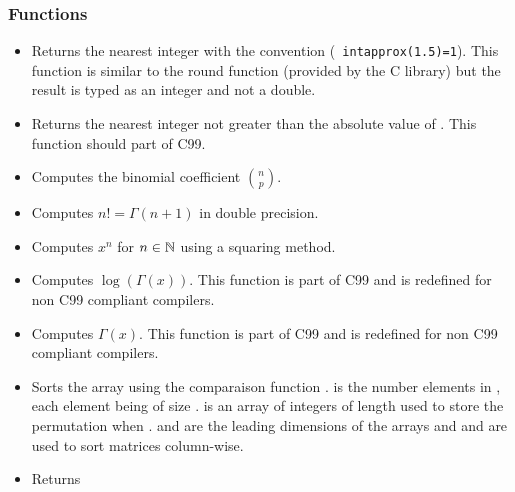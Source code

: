 \subsubsection{Functions}
\begin{itemize}
\item {}
  \sshortdescribe Returns the nearest integer with the convention ({\tt
    intapprox(1.5)=1}). This function is similar to the round function
  (provided by the C library) but the result is typed as an integer and not a
  double.

\item {}
  \sshortdescribe Returns the nearest integer not greater than the absolute
  value of . This function should part of C99.

\item {}
  \sshortdescribe Computes the binomial coefficient $\binom{n}{p}$.

\item {}
  \sshortdescribe Computes $n! = \Gamma(n+1)$ in double precision.

\item {}
  \sshortdescribe Computes $x^n$ for $n \in {\mathbb N}$ using a squaring method.

\item {}
  \sshortdescribe Computes $\log(\Gamma(x))$. This function is part of C99 and is
  redefined for non C99 compliant compilers.

\item {}
  \sshortdescribe Computes $\Gamma(x)$. This function is part of C99 and is
  redefined for non C99 compliant compilers.

\item {}
  \sshortdescribe Sorts the array  using the comparaison function
  .  is the number elements in , each element being of
  size .  is an array of integers of length  used to store
  the permutation when .  and  are the
  leading dimensions of the arrays  and  and are used to sort
  matrices column-wise. 

\item {}
  \sshortdescribe Returns 


\end{itemize}
